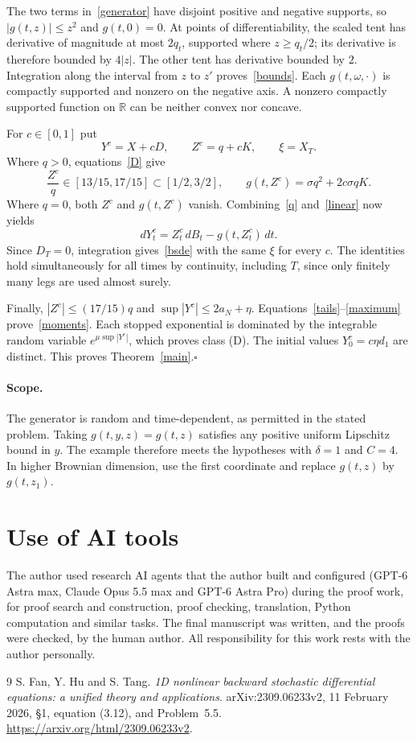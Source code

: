 \documentclass[11pt]{article}
\begin{document}
The two terms in~\eqref{generator} have disjoint positive and negative supports, so $|g(t,z)|\leq z^2$ and $g(t,0)=0$. At points of differentiability, the scaled tent has derivative of magnitude at most $2q_t$, supported where $z\geq q_t/2$; its derivative is therefore bounded by $4|z|$. The other tent has derivative bounded by $2$. Integration along the interval from $z$ to $z'$ proves~\eqref{bounds}. Each $g(t,\omega,\cdot)$ is compactly supported and nonzero on the negative axis. A nonzero compactly supported function on $\mathbb R$ can be neither convex nor concave.

For $c\in[0,1]$ put
\[
 Y^c=X+cD,\qquad Z^c=q+cK,\qquad \xi=X_T.
\]
Where $q>0$, equations~\eqref{D} give
\[
 \frac{Z^c}{q}\in[13/15,17/15]\subset[1/2,3/2],
 \qquad
 g(t,Z^c)=\sigma q^2+2c\sigma qK.
\]
Where $q=0$, both $Z^c$ and $g(t,Z^c)$ vanish. Combining~\eqref{q} and~\eqref{linear} now yields
\[
 dY^c_t=Z^c_t\,dB_t-g(t,Z^c_t)\,dt.
\]
Since $D_T=0$, integration gives~\eqref{bsde} with the same $\xi$ for every $c$. The identities hold simultaneously for all times by continuity, including $T$, since only finitely many legs are used almost surely.

Finally, $|Z^c|\leq(17/15)q$ and $\sup|Y^c|\leq2a_N+\eta$. Equations~\eqref{tails}--\eqref{maximum} prove~\eqref{moments}. Each stopped exponential is dominated by the integrable random variable $e^{\mu\sup|Y^c|}$, which proves class (D). The initial values $Y^c_0=c\eta d_1$ are distinct. This proves Theorem~\ref{main}.\hfill$\square$

\paragraph{Scope.}
The generator is random and time-dependent, as permitted in the stated problem. Taking $g(t,y,z)=g(t,z)$ satisfies any positive uniform Lipschitz bound in $y$. The example therefore meets the hypotheses with $\delta=1$ and $C=4$. In higher Brownian dimension, use the first coordinate and replace $g(t,z)$ by $g(t,z_1)$.

\section*{Use of AI tools}
The author used research AI agents that the author built and configured (GPT-6 Astra max,
Claude Opus 5.5 max and GPT-6 Astra Pro) during the proof work, for proof search and
construction, proof checking, translation, Python computation and similar tasks. The final
manuscript was written, and the proofs were checked, by the human author. All responsibility
for this work rests with the author personally.

\begin{thebibliography}{9}
 S. Fan, Y. Hu and S. Tang.
\emph{1D nonlinear backward stochastic differential equations: a unified theory and applications}.
arXiv:2309.06233v2, 11 February 2026, \S1, equation (3.12), and Problem~5.5.
\url{https://arxiv.org/html/2309.06233v2}.
\end{thebibliography}
\end{document}
